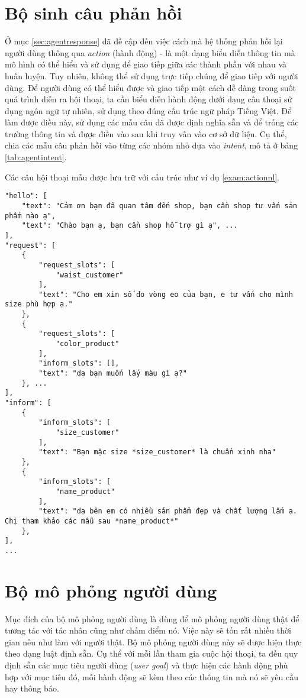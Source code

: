 \section{Bộ sinh câu phản hồi}
Ở mục \ref{sec:agentresponse} đã đề cập đến việc cách mà hệ thống phản hồi lại người dùng thông qua \textit{action} (hành động) - là một dạng biểu diễn thông tin mà mô hình có thể hiểu và sử dụng để giao tiếp giữa các thành phần với nhau và huấn luyện. Tuy nhiên, không thể sử dụng trực tiếp chúng để giao tiếp với người dùng. Để người dùng có thể hiểu được và giao tiếp một cách dễ dàng trong suốt quá trình diễn ra hội thoại, ta cần biểu diễn hành động dưới dạng câu thoại sử dụng ngôn ngữ tự nhiên, sử dụng theo đúng cấu trúc ngữ pháp Tiếng Việt. Để làm được điều này, sử dụng các mẫu câu đã được định nghĩa sẵn và để trống các trường thông tin và được điền vào sau khi truy vấn vào cơ sở dữ liệu. Cụ thể, chia các mẫu câu phản hồi vào từng các nhóm nhỏ dựa vào \textit{intent}, mô tả ở bảng \ref{tab:agentintent}.

Các câu hội thoại mẫu được lưu trữ với cấu trúc như ví dụ \ref{exam:actionnl}.

\renewcommand{\lstlistingname}{Ví dụ}
\begin{lstlisting}[caption={Câu hội thoại mẫu},label={exam:actionnl},language=code_vn,firstnumber=1]
"hello": [
    "text": "Cảm ơn bạn đã quan tâm đến shop, bạn cần shop tư vấn sản phẩm nào ạ",
    "text": "Chào bạn ạ, bạn cần shop hỗ trợ gì ạ", ...
],
"request": [
    {
        "request_slots": [
            "waist_customer"
        ],
        "text": "Cho em xin số đo vòng eo của bạn, e tư vấn cho mình size phù hợp ạ."
    },
    {
        "request_slots": [
            "color_product"
        ],
        "inform_slots": [],
        "text": "dạ bạn muốn lấy màu gì ạ?"
    }, ...
],
"inform": [
    {
        "inform_slots": [
            "size_customer"
        ],
        "text": "Bạn mặc size *size_customer* là chuẩn xinh nha"
    },
    {
        "inform_slots": [
            "name_product"
        ],
        "text": "dạ bên em có nhiều sản phẩm đẹp và chất lượng lắm ạ. Chị tham khảo các mẫu sau *name_product*"
    },
],
...
\end{lstlisting}

\section{Bộ mô phỏng người dùng}
\label{sec:usersim}
Mục đích của bộ mô phỏng người dùng là dùng để mô phỏng người dùng thật để tương tác với tác nhân cũng như chấm điểm nó. Việc này sẽ tốn rất nhiều thời gian nếu như làm với người thật. Bộ mô phỏng người dùng này sẽ được hiện thực theo dạng luật định sẵn. Cụ thể với mỗi lần tham gia cuộc hội thoại, ta đều quy định sẵn các mục tiêu người dùng (\textit{user goal}) và thực hiện các hành động phù hợp với mục tiêu đó, mỗi hành động sẽ kèm theo các thông tin mà nó sẽ yêu cầu hay thông báo.

